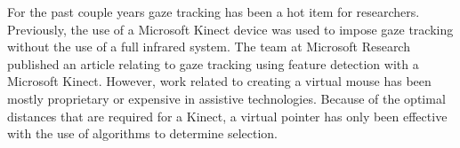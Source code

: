 
For the past couple years gaze tracking has been a hot item for researchers.  Previously, the use of a Microsoft Kinect device was used to impose gaze tracking without the use of a full infrared system.  The team at Microsoft Research published an article relating to gaze tracking using feature detection with a Microsoft Kinect.  However, work related to creating a virtual mouse has been mostly proprietary or expensive in assistive technologies.  Because of the optimal distances that are required for a Kinect,  a virtual pointer has only been effective with the use of algorithms to determine selection.